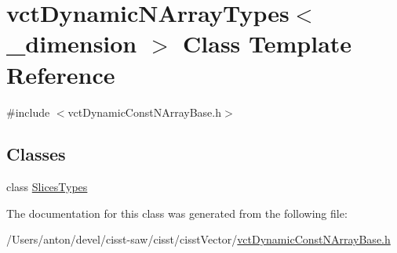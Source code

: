 \hypertarget{classvct_dynamic_n_array_types}{}\section{vct\+Dynamic\+N\+Array\+Types$<$ \+\_\+dimension $>$ Class Template Reference}
\label{classvct_dynamic_n_array_types}


{\ttfamily \#include $<$vct\+Dynamic\+Const\+N\+Array\+Base.\+h$>$}

\subsection*{Classes}
\begin{DoxyCompactItemize}
\item 
class \hyperlink{classvct_dynamic_n_array_types_1_1_slices_types}{Slices\+Types}
\end{DoxyCompactItemize}


The documentation for this class was generated from the following file\+:\begin{DoxyCompactItemize}
\item 
/\+Users/anton/devel/cisst-\/saw/cisst/cisst\+Vector/\hyperlink{vct_dynamic_const_n_array_base_8h}{vct\+Dynamic\+Const\+N\+Array\+Base.\+h}\end{DoxyCompactItemize}
